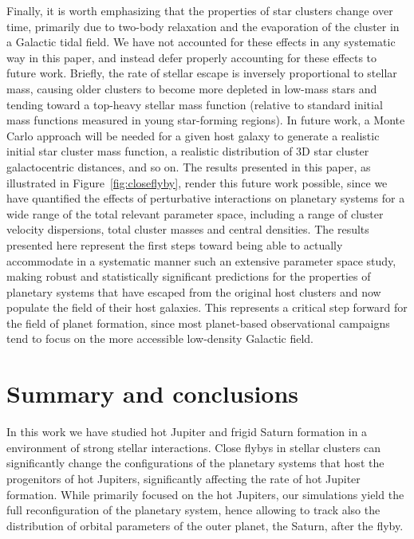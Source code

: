 \documentclass[twocolumn]{aastex63}
\begin{document}
Finally, it is worth emphasizing that the properties of star clusters change over time, primarily due to two-body relaxation and the evaporation of the cluster in a Galactic tidal field.  We have not accounted for these effects in any systematic way in this paper, and instead defer properly accounting for these effects to future work.  Briefly, the rate of stellar escape is inversely proportional to stellar mass, causing older clusters to become more depleted in low-mass stars and tending toward a top-heavy stellar mass function (relative to standard initial mass functions measured in young star-forming regions). In future work, a Monte Carlo approach will be needed for a given host galaxy to generate a realistic initial star cluster mass function, a realistic distribution of 3D star cluster galactocentric distances, and so on.  The results presented in this paper, as illustrated in Figure~\ref{fig:closeflyby}, render this future work possible, since we have quantified the effects of perturbative interactions on planetary systems for a wide range of the total relevant parameter space, including a range of cluster velocity dispersions, total cluster masses and central densities.  The results presented here represent the first steps toward being able to actually accommodate in a systematic manner such an extensive parameter space study, making robust and statistically significant predictions for the properties of planetary systems that have escaped from the original host clusters and now populate the field of their host galaxies.  This represents a critical step forward for the field of planet formation, since most planet-based observational campaigns tend to focus on the more accessible low-density Galactic field.

\section{Summary and conclusions}

In this work we have studied hot Jupiter and frigid Saturn formation in a environment of strong stellar interactions. Close flybys in stellar clusters can significantly change the configurations of the planetary systems that host the progenitors of hot Jupiters, significantly affecting the rate of hot Jupiter formation.  While primarily focused on the hot Jupiters, our simulations yield the full reconfiguration of the planetary system, hence allowing to track also the distribution of orbital parameters of the outer planet, the Saturn, after the flyby. 
\end{document}
